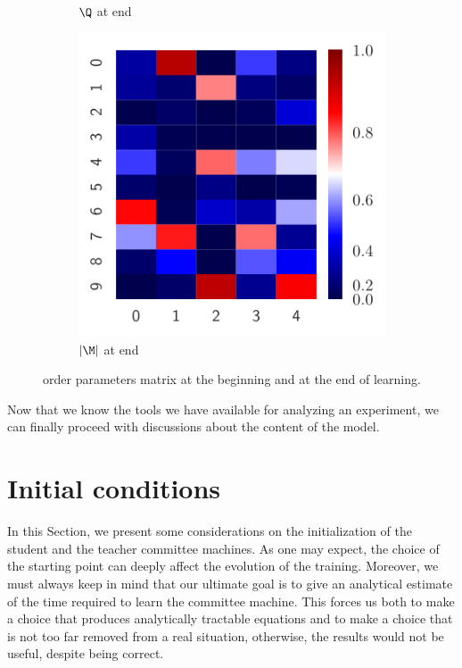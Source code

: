 \begin{figure}
\begin{subfigure}{0.495\textwidth}
    \caption{\(\Q\) at end}
  \end{subfigure}
  \begin{subfigure}{0.495\textwidth}
    \includegraphics[width=1.\textwidth]{figures/simulation_examples_M_end.pdf}
    \caption{\(|\M|\) at end}
  \end{subfigure}

  \caption{
    order parameters matrix at the beginning and at the end of learning. 
  }
  \label{fig:simulation_example_macroscopic}
\end{figure}

Now that we know the tools we have available for analyzing an experiment, we can finally proceed with discussions about the content of the model.


\FloatBarrier
\section{Initial conditions}
In this Section, we present some considerations on the initialization of the student
and the teacher committee machines. As one may expect, the choice of the starting point 
can deeply affect the evolution of the training.
Moreover, we must always keep in mind that our ultimate goal is to give
an analytical estimate of the time required to learn the committee machine.
This forces us both to make a choice that produces analytically tractable equations
and to make a choice that is not too far removed from a real situation,
otherwise, the results would not be useful, despite being correct.


